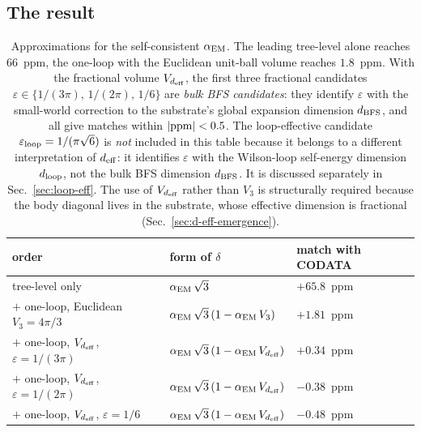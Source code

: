 \documentclass[11pt,a4paper]{article}
\begin{document}
\subsection{The result}

\begin{table}[h]
\centering
\begin{tabular}{lll}
\toprule
order & form of $\delta$ & match with CODATA\\
\midrule
tree-level only &
$\alpha_{\rm EM}\,\sqrt{3}$ &
$+65.8$~ppm\\
$+$ one-loop, Euclidean $V_3 = 4\pi/3$ &
$\alpha_{\rm EM}\,\sqrt{3}\,(1 - \alpha_{\rm EM}\,V_3)$ &
$+1.81$~ppm\\
$+$ one-loop, $V_{d_{\rm eff}}$, $\varepsilon = 1/(3\pi)$ &
$\alpha_{\rm EM}\,\sqrt{3}\,(1 - \alpha_{\rm EM}\,V_{d_{\rm eff}})$ &
$+0.34$~ppm\\
$+$ one-loop, $V_{d_{\rm eff}}$, $\varepsilon = 1/(2\pi)$ &
$\alpha_{\rm EM}\,\sqrt{3}\,(1 - \alpha_{\rm EM}\,V_{d_{\rm eff}})$ &
$-0.38$~ppm\\
$+$ one-loop, $V_{d_{\rm eff}}$, $\varepsilon = 1/6$ &
$\alpha_{\rm EM}\,\sqrt{3}\,(1 - \alpha_{\rm EM}\,V_{d_{\rm eff}})$ &
$-0.48$~ppm\\
\bottomrule
\end{tabular}
\caption{Approximations for the self-consistent $\alpha_{\rm EM}$.
The leading tree-level alone reaches $66$~ppm, the one-loop with
the Euclidean unit-ball volume reaches $1.8$~ppm. With the
fractional volume $V_{d_{\rm eff}}$, the first
three fractional candidates $\varepsilon \in
\{1/(3\pi),\,1/(2\pi),\,1/6\}$ are \emph{bulk BFS candidates}:
they identify $\varepsilon$ with the small-world correction to
the substrate's global expansion dimension $d_{\rm BFS}$, and all
give matches within $|{\rm ppm}| < 0.5$. The loop-effective
candidate $\varepsilon_{\rm loop} = 1/(\pi\sqrt{6})$ is
\emph{not} included in this table because it belongs to a
different interpretation of $d_{\rm eff}$: it identifies
$\varepsilon$ with the Wilson-loop self-energy dimension
$d_{\rm loop}$, not the bulk BFS dimension $d_{\rm BFS}$. It
is discussed separately in Sec.~\ref{sec:loop-eff}. The use
of $V_{d_{\rm eff}}$ rather than $V_3$ is structurally
required because the body diagonal lives in the substrate,
whose effective dimension is fractional
(Sec.~\ref{sec:d-eff-emergence}).}
\label{tab:alpha-three-levels}
\end{table}
\end{document}
